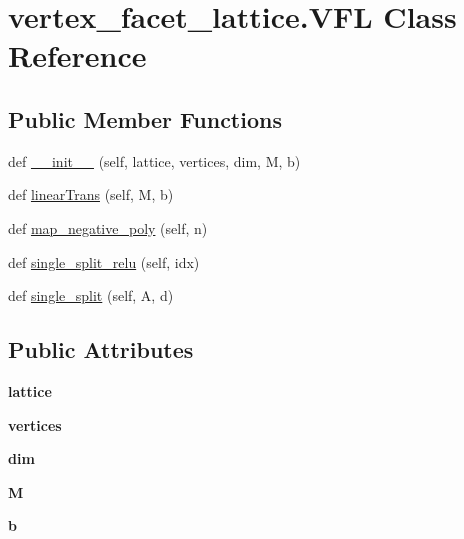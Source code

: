 \hypertarget{classvertex__facet__lattice_1_1VFL}{}\section{vertex\+\_\+facet\+\_\+lattice.\+V\+FL Class Reference}
\label{classvertex__facet__lattice_1_1VFL}
\subsection*{Public Member Functions}
\begin{DoxyCompactItemize}
\item 
def \hyperlink{classvertex__facet__lattice_1_1VFL_a0657c8c08ad4ed2b4c78dde5f020ca9e}{\+\_\+\+\_\+init\+\_\+\+\_\+} (self, lattice, vertices, dim, M, b)
\item 
def \hyperlink{classvertex__facet__lattice_1_1VFL_ac24a7e3a7c2b5fd64b9b64dee65aa762}{linear\+Trans} (self, M, b)
\item 
def \hyperlink{classvertex__facet__lattice_1_1VFL_ae9e7eb17406dc576a544decaec956bbc}{map\+\_\+negative\+\_\+poly} (self, n)
\item 
def \hyperlink{classvertex__facet__lattice_1_1VFL_afee114c93d9ab6cf9cc36af9dab9ddfd}{single\+\_\+split\+\_\+relu} (self, idx)
\item 
def \hyperlink{classvertex__facet__lattice_1_1VFL_a1024ee850939d4c02e21c0398d3bfc8a}{single\+\_\+split} (self, A, d)
\end{DoxyCompactItemize}
\subsection*{Public Attributes}
\begin{DoxyCompactItemize}
\item 
\mbox{\label{classvertex__facet__lattice_1_1VFL_a9d38b19632334ef3142e4968d0b1d2bc}} 
{\bfseries lattice}
\item 
\mbox{\label{classvertex__facet__lattice_1_1VFL_ae18d106c24ca606f63cf75b520618558}} 
{\bfseries vertices}
\item 
\mbox{\label{classvertex__facet__lattice_1_1VFL_ae6444e2ec916e0e5c06a6f8c1e974ee3}} 
{\bfseries dim}
\item 
\mbox{\label{classvertex__facet__lattice_1_1VFL_ab01d41cccb27cd78b632bb771aa4b49f}} 
{\bfseries M}
\item 
\mbox{\label{classvertex__facet__lattice_1_1VFL_a83d80abdeb5ec08c80c7338cd9f731bf}} 
{\bfseries b}
\end{DoxyCompactItemize}


